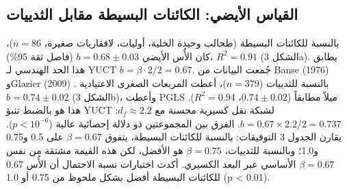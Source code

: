 \documentclass[11pt,a4paper]{article}
\newcommand{\betaf}{\beta}
\newcommand{\df}{d_f}
\begin{document}
	\subsection{القياس الأيضي: الكائنات البسيطة مقابل الثدييات}
	
	بالنسبة للكائنات البسيطة (طحالب وحيدة الخلية، أوليات، لافقاريات صغيرة، \(n = 86\))، كان الأُس الأيضي \(b = 0.68 \pm 0.03\) (فاصل ثقة 95\%)، \(R^2 = 0.91\) (الشكل 3a). يطابق هذا الحد الهندسي لـ YUCT \(b = \betaf \cdot 2/2 = 0.67\). جُمعت البيانات من Banse (1976) \cite{Banse1976} وGlazier (2009) \cite{Glazier2009}. بالنسبة للثدييات (\(n = 379\))، أعطت المربعات الصغرى الاعتيادية \(b = 0.74 \pm 0.02\) (الشكل 3b)، وأعطت PGLS ميلاً مطابقاً (\(0.74 \pm 0.02\)، \(R^2 = 0.94\)). هذا هو بالضبط تنبؤ YUCT لشبكة نقل كسيرية محسنة مع \(\df \approx 2.2\): \(b = 0.67 \times 2.2 / 2 = 0.737\). الفرق بين المجموعتين ذو دلالة إحصائية عالية (\(p < 10^{-6}\)). يقارن الجدول 3 التوفيقات: بالنسبة للكائنات البسيطة، يتفوق \(\beta = 0.67\) على 0.5 و0.75 و1.0؛ وبالنسبة للثدييات، \(\beta = 0.75\) هو الأفضل، لكن هذه القيمة مشتقة من نفس \(\beta = 0.67\) الأساسي عبر البعد الكسيري. أكدت اختبارات نسبة الاحتمال أن الأُس 0.67 للكائنات البسيطة أفضل بشكل ملحوظ من 0.75 أو 1.0 (p < 0.01).
	
\end{document}
